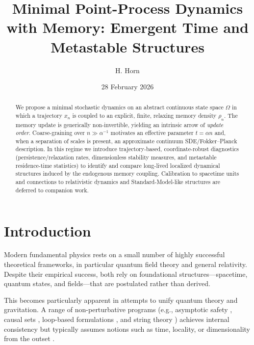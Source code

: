 \documentclass[reprint,amsmath,amssymb,aps,prd,nofootinbib,floatfix]{revtex4-2}
\begin{document}
\title{Minimal Point-Process Dynamics with Memory: Emergent Time and Metastable Structures}

\author{H. Horn}

\date{28 February 2026} %

\begin{abstract}
We propose a minimal stochastic dynamics on an abstract continuous state space $\Omega$ in which a trajectory $x_n$ is coupled to an explicit, finite, relaxing memory density $\rho_n$.
The memory update is generically non-invertible, yielding an intrinsic arrow of \emph{update order}.
Coarse-graining over $n\gg\alpha^{-1}$ motivates an effective parameter $t=\alpha n$ and, when a separation of scales is present, an approximate continuum SDE/Fokker--Planck description.
In this regime we introduce trajectory-based, coordinate-robust diagnostics (persistence/relaxation rates, dimensionless stability measures, and metastable residence-time statistics) to identify and compare long-lived localized dynamical structures induced by the endogenous memory coupling.
Calibration to spacetime units and connections to relativistic dynamics and Standard-Model-like structures are deferred to companion work.
\end{abstract}

\maketitle

\section{Introduction}

Modern fundamental physics rests on a small number of highly successful theoretical frameworks, in particular quantum field theory and general relativity.
Despite their empirical success, both rely on foundational structures---spacetime, quantum states, and fields---that are postulated rather than derived.

This becomes particularly apparent in attempts to unify quantum theory and gravitation.
A range of non-perturbative programs (e.g., asymptotic safety \cite{Weinberg1979,Reuter1998,NiedermaierReuter2006,Percacci2017}, causal sets \cite{Bombelli1987,Sorkin2003}, loop-based formulations \cite{Rovelli2004,AshtekarLewandowski2004}, and string theory \cite{Polchinski1998}) achieves internal consistency but typically assumes notions such as time, locality, or dimensionality from the outset \cite{Anderson1972,Laughlin2000}.
\end{document}
